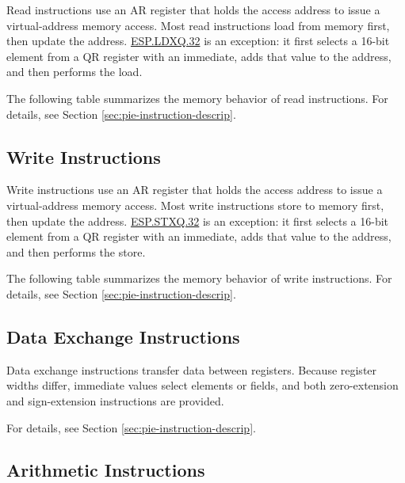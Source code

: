 \documentclass[main\_\_EN.tex]{subfiles}
\begin{document}
Read instructions use an AR register that holds the access address to issue a virtual-address memory access. Most read instructions load from memory first, then update the address. \hyperref[instruction:ESPLDXQ32]{ESP.LDXQ.32} is an exception: it first selects a 16-bit element from a QR register with an immediate, adds that value to the address, and then performs the load.


The following table summarizes the memory behavior of read instructions. For details, see Section \ref{sec:pie-instruction-descrip}.

\newpage


\subsection{Write Instructions}
\label{sec:pie-write-instructions}

Write instructions use an AR register that holds the access address to issue a virtual-address memory access. Most write instructions store to memory first, then update the address. \hyperref[instruction:ESPSTXQ32]{ESP.STXQ.32} is an exception: it first selects a 16-bit element from a QR register with an immediate, adds that value to the address, and then performs the store.


The following table summarizes the memory behavior of write instructions. For details, see Section \ref{sec:pie-instruction-descrip}.



\subsection{Data Exchange Instructions}
\label{sec:pie-data-exchange-instructions}

Data exchange instructions transfer data between registers. Because register widths differ, immediate values select elements or fields, and both zero-extension and sign-extension instructions are provided.

For details, see Section \ref{sec:pie-instruction-descrip}.



\subsection{Arithmetic Instructions}
\label{sec:pie-arithmetic-instructions}
\end{document}
